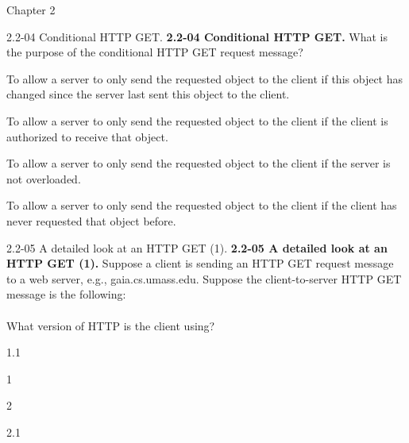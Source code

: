 \documentclass[a4paper]{article}
\begin{document}
\begin{quiz}{Chapter 2}
\begin{multi}[points=1,shuffle]{2.2-04 Conditional HTTP GET.}
\textbf{2.2-04 Conditional HTTP GET. } What is the purpose of the conditional HTTP GET request message?
\item* To allow a server to only send the requested object to the client if this object has changed since the server last sent this object to the client.
\item To allow a server to only send the requested object to the client if the client is authorized to receive that object.
\item To allow a server to only send the requested object to the client if the server is not overloaded.
\item To allow a server to only send the requested object to the client if the client has never requested that object before.
\end{multi}

\begin{multi}[points=1,shuffle]{2.2-05 A detailed look at an HTTP GET (1).}
\textbf{2.2-05 A detailed look at an HTTP GET (1).} 
Suppose a client is sending an HTTP GET request message to a web server, e.g., gaia.cs.umass.edu. Suppose the client-to-server HTTP GET message is the following:\\

\\

What version of HTTP is the client using?
\item* 1.1
\item 1
\item 2
\item 2.1
\end{multi}


\end{quiz}
\end{document}
